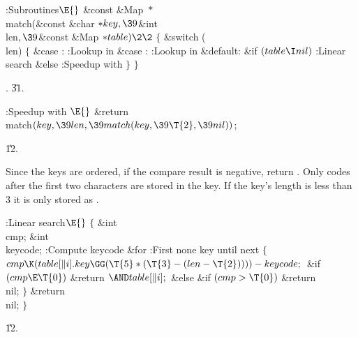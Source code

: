 \Y\B\4:Subroutines\X${}\E{}$\6
\1\1\&{const} \&{Map} ${}{*}{}$\\{match}(\&{const} \&{char} ${}{*}\\{key},%
\39{}$\&{int} \\{len}${},\39{}$\&{const} \&{Map} ${}{*}\\{table})\2\2{}$\6
${}\{{}$\1\6
\&{switch} (\\{len})\5
${}\{{}$\1\6
\4\&{case} :\5
:Lookup in \X\6
\4\&{case} :\5
:Lookup in \X\6
\4\&{default}:\6
\&{if} ${}(\\{table}\I\\{nil}){}$\1\5
:Linear search\X\2\6
\&{else}\1\5
:Speedup with \X\2\6
\4${}\}{}$\2\6
\4${}\}{}$\2\par
{}.
\U31.\fi

\B{}:Speedup with \X${}\E{}$\6
\&{return} \\{match}${}(\\{key},\39\\{len},\39\\{match}(\\{key},\39\T{2},\39%
\\{nil})){}$;\par
\U12.\fi

Since the keys are ordered, if the compare result is negative,
return . Only codes after the first two characters are stored in
the key. If the key's length is less than 3 it is only stored as .

\Y\B\4:Linear search\X${}\E{}$\6
${}\{{}$\1\6
\&{int} \\{cmp};\6
\&{int} \\{keycode};\7
:Compute keycode\X\6
\&{for} :First none  key until next \X\5
${}\{{}$\1\6
${}\\{cmp}\K(\\{table}[\|i].\\{key}\GG(\T{5}*(\T{3}-(\\{len}-\T{2}))))-%
\\{keycode};{}$\6
\&{if} ${}(\\{cmp}\E\T{0}){}$\1\5
\&{return} ${}{\AND}\\{table}[\|i];{}$\2\6
\&{else} \&{if} ${}(\\{cmp}>\T{0}){}$\1\5
\&{return} \\{nil};\2\6
\4${}\}{}$\2\6
\&{return} \\{nil};\6
\4${}\}{}$\2\par
\U12.\fi

